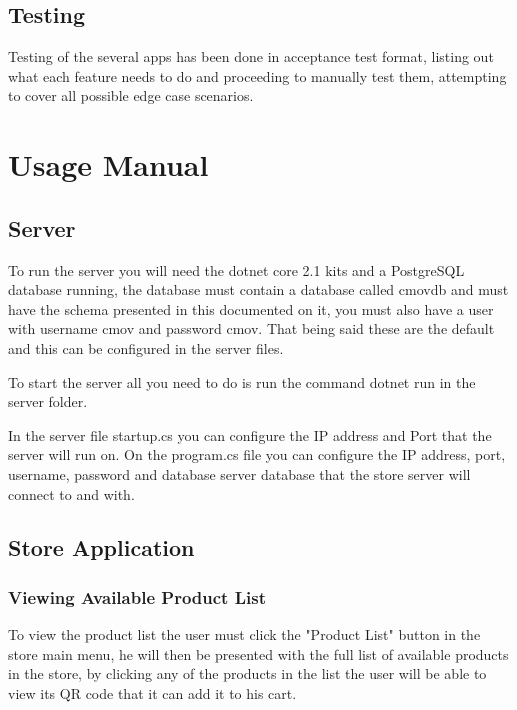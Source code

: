 \documentclass[12pt]{article}
\begin{document}
\subsection{Testing}
\hspace{0.6cm}
Testing of the several apps has been done in acceptance test format, listing out what each feature needs to do and proceeding to manually test them, attempting to cover all
possible edge case scenarios.

\pagebreak
\section{Usage Manual}

\subsection{Server}
\hspace{0.6cm}
To run the server you will need the dotnet core 2.1 kits and a PostgreSQL database running, the database must contain a database called cmovdb and must have the
schema presented in this documented on it, you must also have a user with username cmov and password cmov. That being said these are the default and this can
be configured in the server files.

To start the server all you need to do is run the command dotnet run in the server folder.

In the server file startup.cs you can configure the IP address and Port that the server will run on. On the program.cs file you can configure the IP address, port,
username, password and database server database that the store server will connect to and with.

\subsection{Store Application}
\subsubsection{Viewing Available Product List}
\hspace{0.6cm}
To view the product list the user must click the "Product List" button in the store main menu, he will then
be presented with the full list of available products in the store, by clicking any  of the products in the list
the user will be able to view its QR code that it can add it to his cart.
\end{document}
